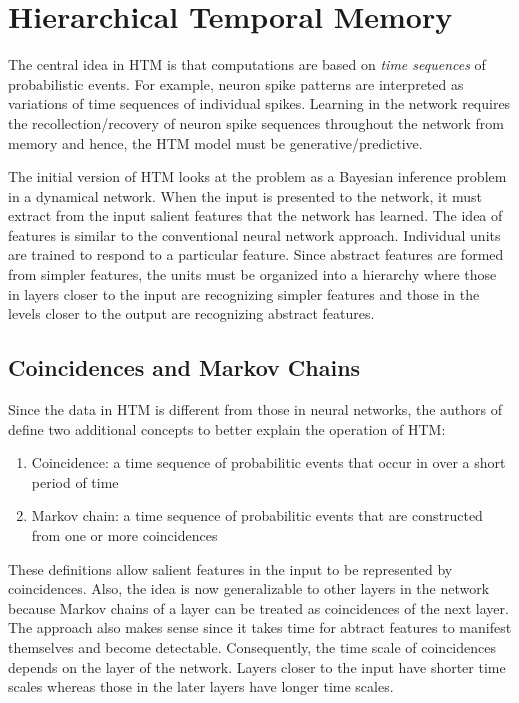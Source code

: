 \section{Hierarchical Temporal Memory}

The central idea in HTM is that computations are based on \emph{time sequences} of probabilistic events. For example, neuron spike patterns are interpreted as variations of time sequences of individual spikes. Learning in the network requires the recollection/recovery of neuron spike sequences throughout the network from memory and hence, the HTM model must be generative/predictive.

The initial version of HTM looks at the problem as a Bayesian inference problem in a dynamical network. When the input is presented to the network, it must extract from the input salient features that the network has learned. The idea of features is similar to the conventional neural network approach. Individual units are trained to respond to a particular feature. Since abstract features are formed from simpler features, the units must be organized into a hierarchy where those in layers closer to the input are recognizing simpler features and those in the levels closer to the output are recognizing abstract features.

\subsection{Coincidences and Markov Chains}
Since the data in HTM is different from those in neural networks, the authors of \cite{George2009} define two additional concepts to better explain the operation of HTM:

\begin{enumerate}
\item Coincidence: a time sequence of probabilitic events that occur in over a short period of time
\item Markov chain: a time sequence of probabilitic events that are constructed from one or more coincidences
\end{enumerate}
These definitions allow salient features in the input to be represented by coincidences. Also, the idea is now generalizable to other layers in the network because Markov chains of a layer can be treated as coincidences of the next layer. The approach also makes sense since it takes time for abtract features to manifest themselves and become detectable. Consequently, the time scale of coincidences depends on the layer of the network. Layers closer to the input have shorter time scales whereas those in the later layers have longer time scales.

